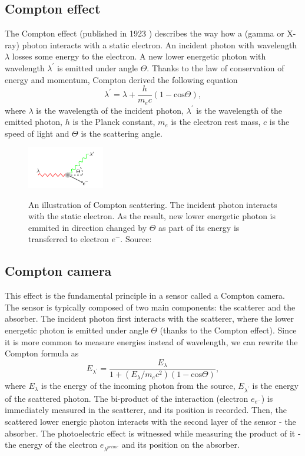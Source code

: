 \subsection{Compton effect}
The Compton effect (published in 1923 \cite{}) describes the way how a (gamma or X-ray) photon interacts with a static electron. An incident photon with wavelength $\lambda$ losses some energy to the electron. A new lower energetic photon with wavelength $\lambda^{\prime}$ is emitted under angle $\Theta$. Thanks to the law of conservation of energy and momentum, Compton derived the following equation
\begin{equation}
    \lambda^{\prime} = \lambda + \frac{h}{m_{e}c}(1-\mathrm{cos} \Theta),
\end{equation}
where $\lambda$ is the wavelength of the incident photon, $\lambda^{\prime}$ is the wavelength of the emitted photon, $h$ is the Planck constant, $m_{e}$ is the electron rest mass, $c$ is the speed of light and $\Theta$ is the scattering angle.

\begin{figure}[!h]
    \centering
    \includegraphics[width=0.3\textwidth]{./fig/photos/scattering.png}
    \label{fig:scattering}
    \caption{An illustration of Compton scattering. The incident photon interacts with the static electron. As the result, new lower energetic photon is emmited in direction changed by $\Theta$ as part of its energy is transferred to electron $e^{-}$. Source: \cite{baca2021gamma}}
\end{figure}

\subsection{Compton camera}
This effect is the fundamental principle in a sensor called a Compton camera. 
The sensor is typically composed of two main components: the scatterer and the absorber. 
The incident photon first interacts with the scatterer, where the lower energetic photon is emitted under angle $\Theta$ (thanks to the Compton effect). 
Since it is more common to measure energies instead of wavelength, we can rewrite the Compton formula as
\begin{equation}
E_{\lambda^{\prime}} = \frac{E_{\lambda}}{  1 + (E_{\lambda} / m_{e}c^{2}) (1 - \mathrm{cos} \Theta)},
\end{equation}
where $E_{\lambda}$ is the energy of the incoming photon from the source, $E_{\lambda^{\prime}}$ is the energy of the scattered photon.  
The bi-product of the interaction (electron $e_{e^{-}}$) is immediately measured in the scatterer, and its position is recorded.
Then, the scattered lower energic photon interacts with the second layer of the sensor - the absorber. 
The photoelectric effect is witnessed while measuring the product of it - the energy of the electron $e_{\lambda^{prime}}$ and its position on the absorber.

